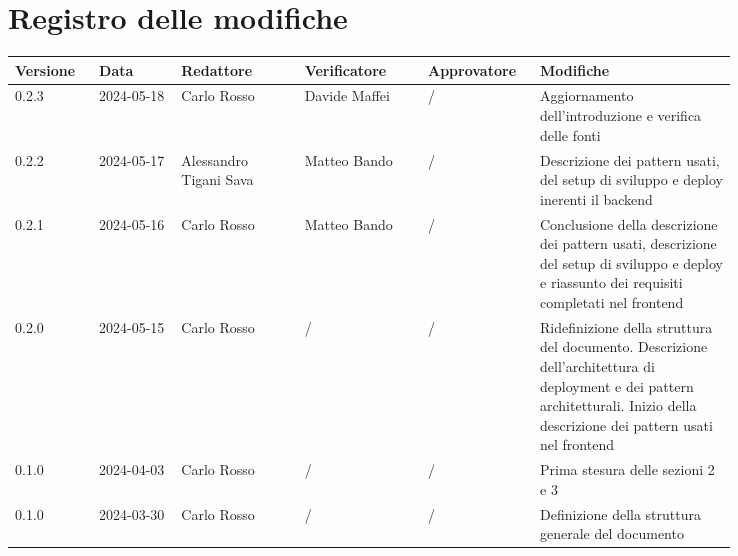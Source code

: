 \section*{Registro delle modifiche}
 {
  \renewcommand{\arraystretch}{1.5}
  \scriptsize
  \begin{longtable}{p{0.10\linewidth}p{0.10\linewidth}p{0.15\linewidth}p{0.15\linewidth}p{0.10\linewidth}p{0.24\linewidth}}
	  \textbf{Versione} & \textbf{Data} & \textbf{Redattore} 		& \textbf{Verificatore} & \textbf{Approvatore} 	& \textbf{Modifiche}                                 \\
	  \toprule
	  0.2.3             & 2024-05-18    & Carlo Rosso	& Davide Maffei & / & Aggiornamento dell'introduzione e verifica delle fonti \\
	  \hline 
	  0.2.2             & 2024-05-17    & Alessandro Tigani Sava	& Matteo Bando 			& /						& Descrizione dei pattern usati,
	  del setup di sviluppo e deploy inerenti il backend \\
	  \hline 
	  0.2.1             & 2024-05-16    & Carlo Rosso				& Matteo Bando 			& /						& Conclusione della descrizione dei pattern usati,
	  descrizione del setup di sviluppo e deploy e riassunto dei requisiti completati nel frontend \\
	  \hline
	  0.2.0             & 2024-05-15    & Carlo Rosso                                      & /
	                    & /             & Ridefinizione della struttura del documento.
	  Descrizione dell'architettura di deployment e dei pattern architetturali.
	  Inizio della descrizione dei pattern usati nel frontend                                                                                                                                  \\
	  \hline
	  0.1.0             & 2024-04-03    & Carlo Rosso                                      & /                     & /                    & Prima stesura delle sezioni 2 e 3                  \\
	  \hline
	  0.1.0             & 2024-03-30    & Carlo Rosso                                      & /                     & /                    & Definizione della struttura generale del documento \\
	  \bottomrule
  \end{longtable}
 }
